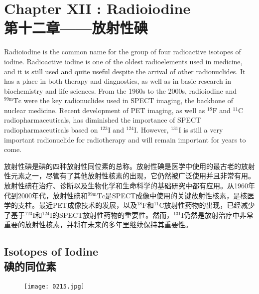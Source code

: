 \documentclass[dvipsnames, svgnames,a4paper,11pt]{article}
\begin{document}
\newpage


\section{Chapter XII : Radioiodine \\第十二章——放射性碘}
Radioiodine is the common name for the group of four radioactive isotopes of iodine. Radioactive iodine is one of the oldest radioelements used in medicine, and it is still used and quite useful despite the arrival of other radionuclides. It has a place in both therapy and diagnostics, as well as in basic research in biochemistry and life sciences. From the 1960s to the 2000s, radioiodine and \(\mathrm{^{99m}Tc}\) were the key radionuclides used in SPECT imaging, the backbone of nuclear medicine. Recent development of PET imaging, as well as \(\mathrm{^{18}F}\) and \(\mathrm{^{11}C}\) radiopharmaceuticals, has diminished the importance of SPECT radiopharmaceuticals based on \(\mathrm{^{123}I}\) and \(\mathrm{^{124}I}\). However, \(\mathrm{^{131}I}\) is still a very important radionuclide for radiotherapy and will remain important for years to come.  

放射性碘是碘的四种放射性同位素的总称。放射性碘是医学中使用的最古老的放射性元素之一，尽管有了其他放射性核素的出现，它仍然被广泛使用并且非常有用。放射性碘在治疗、诊断以及生物化学和生命科学的基础研究中都有应用。从1960年代到2000年代，放射性碘和\(\mathrm{^{99m}Tc}\)是SPECT成像中使用的关键放射性核素，是核医学的支柱。最近PET成像技术的发展，以及\(\mathrm{^{18}F}\)和\(\mathrm{^{11}C}\)放射性药物的出现，已经减少了基于\(\mathrm{^{123}I}\)和\(\mathrm{^{124}I}\)的SPECT放射性药物的重要性。然而，\(\mathrm{^{131}I}\)仍然是放射治疗中非常重要的放射性核素，并将在未来的多年里继续保持其重要性。  

\subsection{Isotopes of Iodine\\碘的同位素} 


\begin{figure}[h]
	\centering
    \texttt{[image: 0215.jpg]}  
     \label{fig269}
\end{figure}
\end{document}
